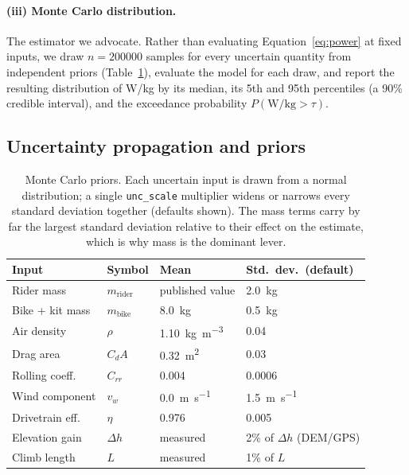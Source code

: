 \documentclass[11pt]{article}
\begin{document}
\paragraph{(iii) Monte Carlo distribution.}
The estimator we advocate. Rather than evaluating Equation~\eqref{eq:power} at
fixed inputs, we draw $n=\num{200000}$ samples for every uncertain quantity from
independent priors (Table~\ref{tab:priors}), evaluate the model for each draw,
and report the resulting distribution of W/kg by its median, its 5th and 95th
percentiles (a 90\% credible interval), and the exceedance probability
$P(\text{W/kg}>\tau)$.

\subsection{Uncertainty propagation and priors}

\begin{table}[t]
\centering
\caption{Monte Carlo priors. Each uncertain input is drawn from a normal
distribution; a single \texttt{unc\_scale} multiplier widens or narrows every
standard deviation together (defaults shown). The mass terms carry by far the
largest standard deviation relative to their effect on the estimate, which is
why mass is the dominant lever.}
\label{tab:priors}
\begin{tabular}{@{}llll@{}}
\toprule
Input & Symbol & Mean & Std.\ dev.\ (default) \\
\midrule
Rider mass        & $m_{\text{rider}}$ & published value & \SI{2.0}{\kg} \\
Bike + kit mass   & $m_{\text{bike}}$  & \SI{8.0}{\kg}   & \SI{0.5}{\kg} \\
Air density       & $\rho$             & \SI{1.10}{\kg\per\meter\cubed} & \num{0.04} \\
Drag area         & $C_dA$             & \SI{0.32}{\meter\squared} & \num{0.03} \\
Rolling coeff.    & $C_{rr}$           & \num{0.004}     & \num{0.0006} \\
Wind component    & $v_{w}$            & \SI{0.0}{\meter\per\second} & \SI{1.5}{\meter\per\second} \\
Drivetrain eff.   & $\eta$             & \num{0.976}     & \num{0.005} \\
Elevation gain    & $\Delta h$         & measured        & 2\% of $\Delta h$ (DEM/GPS) \\
Climb length      & $L$                & measured        & 1\% of $L$ \\
\bottomrule
\end{tabular}
\end{table}
\end{document}
